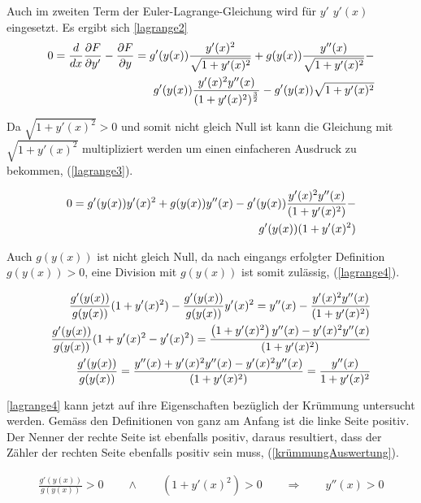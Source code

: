 Auch im zweiten Term der Euler-Lagrange-Gleichung wird für $y'$ $y'(x)$ eingesetzt. Es ergibt sich \eqref{lagrange2}
\begin{align}
	0 = \frac{d}{dx} \frac{\partial F}{\partial y'} - \frac{\partial F}{\partial y} = 
	g'(y(x)) \frac{y'(x)^2}{\sqrt{1 + y'(x)^2}} + g(y(x)) \frac{y''(x)}{\sqrt{1 + y'(x)^2}} - \notag \\
	g'(y(x)) \frac{y'(x)^2 y''(x)}{(1 + y'(x)^2)^\frac{3}{2}}  - g'(y(x)) \sqrt{1 + y'(x)^2}
	\label{lagrange2}
\end{align}

Da $\sqrt{1 + y'(x)^2} > 0$ und somit nicht gleich Null ist kann die Gleichung mit $\sqrt{1 + y'(x)^2}$  multipliziert werden um einen einfacheren Ausdruck zu bekommen, (\eqref{lagrange3}).

\begin{align}
	0 = g'(y(x)) y'(x)^2 + g(y(x)) y''(x) - g'(y(x)) \frac{y'(x)^2 y''(x)}{(1 + y'(x)^2)} - \notag \\ 
	g'(y(x)) (1 + y'(x)^2)
	\label{lagrange3}
\end{align}

Auch $g(y(x))$ ist nicht gleich Null, da nach eingangs erfolgter Definition $g(y(x)) > 0$, eine Division mit $g(y(x))$ ist somit zulässig, (\eqref{lagrange4}).

\begin{align}
	\frac{g'(y(x))}{g(y(x))} (1 + y'(x)^2) - \frac{g'(y(x))}{g(y(x))} y'(x)^2 =  y''(x) - \frac{y'(x)^2 y''(x)}{(1 + y'(x)^2)} \notag \\
	\frac{g'(y(x))}{g(y(x))} (1 + y'(x)^2 - y'(x)^2) = \frac{\left(1 + y'(x)^2 \right)y''(x) - y'(x)^2 y''(x)}{(1 + y'(x)^2)} \notag \\
	\frac{g'(y(x))}{g(y(x))} = \frac{y''(x) + y'(x)^2 y''(x) - y'(x)^2 y''(x)}{(1 + y'(x)^2)} = \frac{y''(x)}{1 + y'(x)^2}
	\label{lagrange4}
\end{align}


\eqref{lagrange4} kann jetzt auf ihre Eigenschaften bezüglich der Krümmung untersucht werden. Gemäss den Definitionen von ganz am Anfang ist die linke Seite positiv. 
Der Nenner der rechte Seite ist ebenfalls positiv, daraus resultiert, dass der Zähler der rechten Seite ebenfalls positiv sein muss, (\eqref{krümmungAuswertung}).

\begin{align}
	\frac{g'(y(x))}{g(y(x))} > 0 \qquad \wedge \qquad (1 + y'(x)^2) > 0 \qquad \Rightarrow \qquad y''(x) > 0
	\label{krümmungAuswertung}
\end{align}

